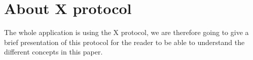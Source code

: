 \section{About X protocol}
The whole application is using the X protocol, we are therefore going
 to give a brief presentation of this protocol for the reader to be able 
to understand the different concepts in this paper.